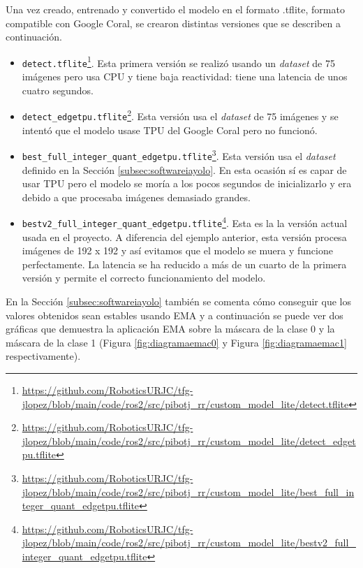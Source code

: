 

Una vez creado, entrenado y convertido el modelo en el formato .tflite, formato compatible con Google Coral, se crearon distintas versiones que se describen a continuación.  
\begin{itemize}
	\item \verb|detect.tflite|\footnote{\url{https://github.com/RoboticsURJC/tfg-jlopez/blob/main/code/ros2/src/pibotj_rr/custom_model_lite/detect.tflite}}. Esta primera versión se realizó usando un \textit{dataset} de 75 imágenes pero usa CPU y tiene baja reactividad: tiene una latencia de unos cuatro segundos.
	\item \verb|detect_edgetpu.tflite|\footnote{\url{https://github.com/RoboticsURJC/tfg-jlopez/blob/main/code/ros2/src/pibotj_rr/custom_model_lite/detect_edgetpu.tflite}}. Esta versión usa el \textit{dataset} de 75 imágenes y se intentó que el modelo usase \ac{TPU} del Google Coral pero no funcionó.
	\item \verb|best_full_integer_quant_edgetpu.tflite|\footnote{\url{https://github.com/RoboticsURJC/tfg-jlopez/blob/main/code/ros2/src/pibotj_rr/custom_model_lite/best_full_integer_quant_edgetpu.tflite}}. Esta versión usa el \textit{dataset} definido en la Sección \ref{subsec:softwareiayolo}. En esta ocasión sí es capar de usar \acs{TPU} pero el modelo se moría a los pocos segundos de inicializarlo y era debido a que procesaba imágenes demasiado grandes.
	\item \verb|bestv2_full_integer_quant_edgetpu.tflite|\footnote{\url{https://github.com/RoboticsURJC/tfg-jlopez/blob/main/code/ros2/src/pibotj_rr/custom_model_lite/bestv2_full_integer_quant_edgetpu.tflite}}. Esta es la la versión actual usada en el proyecto. A diferencia del ejemplo anterior, esta versión procesa imágenes de 192 x 192 y así evitamos que el modelo se muera y funcione perfectamente. La latencia se ha reducido a más de un cuarto de la primera versión y permite el correcto funcionamiento del modelo.	
\end{itemize}


En la Sección \ref{subsec:softwareiayolo} también se comenta cómo conseguir que los valores obtenidos sean estables usando \acs{EMA} y a continuación se puede ver dos gráficas que demuestra la aplicación EMA sobre la máscara de la clase 0 y la máscara de la clase 1 (Figura \ref{fig:diagramaemac0} y Figura \ref{fig:diagramaemac1} respectivamente).

